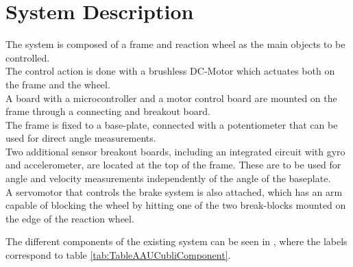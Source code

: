 \chapter{System Description}\label{systemDescription}
The system is composed of a frame and reaction wheel as the main objects to be controlled.\\
The control action is done with a brushless DC-Motor which actuates both on the frame and the wheel.\\ 
A board with a microcontroller and a motor control board are mounted on the frame through a connecting and breakout board.\\ 
The frame is fixed to a base-plate, connected with a potentiometer that can be used for direct angle measurements.\\ 
Two additional sensor breakout boards, including an integrated circuit with gyro and accelerometer, are located at the top of the frame. These are to be used for angle and velocity measurements independently of the angle of the baseplate.\\ 
A servomotor that controls the brake system is also attached, which has an arm capable of blocking the wheel by hitting one of the two break-blocks mounted on the edge of the reaction wheel.

The different components of the existing system can be seen in , where the labels correspond to table \ref{tab:TableAAUCubliComponent}.

